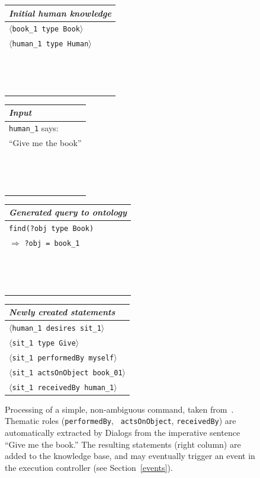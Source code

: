 \documentclass[preprint,3p,times]{elsarticle}
\newcommand{\concept}[1]{{\small \texttt{#1}}}
\newcommand{\stmt}[1]{{\footnotesize\tt$\langle$#1\relax$\rangle$}}
\begin{document}
\begin{figure}
    \centering
    \begin{tabular}{l}
        \emph{Initial human knowledge} \\
        \hline
        \stmt{book\_1 type Book} \\
        \stmt{human\_1 type Human} \\
        ~\\
        ~\\
        ~\\
    \end{tabular}
    \begin{tabular}{l}
        \emph{Input}\\

        \hline

        \concept{human\_1} says:\\
        ``Give me the book'' \\
        ~\\
        ~\\
        ~\\

    \end{tabular}
    \begin{tabular}{l}

        \emph{Generated query to ontology} \\
        \hline
        \concept{find(?obj type Book)} \\ 
        \hspace{0.2cm}$\Rightarrow$ \concept{?obj = book\_1} \\
        ~\\
        ~\\
        ~\\
    \end{tabular}
    \begin{tabular}{l}

        \emph{Newly created statements}\\
        \hline
        \stmt{human\_1 desires sit\_1} \\
         \stmt{sit\_1 type Give} \\
         \stmt{sit\_1 performedBy myself} \\
         \stmt{sit\_1 actsOnObject book\_01} \\
         \stmt{sit\_1 receivedBy human\_1} \\
    \end{tabular}

    \caption{Processing of a simple, non-ambiguous command, taken
        from~\cite{Lemaignan2011a}. Thematic roles ({\tt performedBy}, {\tt
        actsOnObject}, {\tt receivedBy}) are automatically extracted by 
    {\sc Dialogs} from the imperative sentence ``Give me the book.'' The 
    resulting statements (right column) are added to the knowledge base, and
    may eventually trigger an event in the execution controller (see
    Section~\ref{events}).}

    \label{dialogs|ex}
\end{figure}
\end{document}

